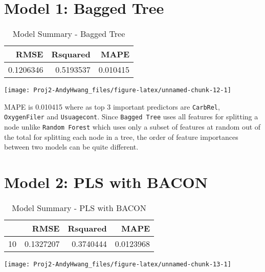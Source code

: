 \documentclass[]{report}
\begin{document}
\section{Model 1: Bagged Tree}\label{model-1-bagged-tree}

\begin{table}[H]

\caption{\label{tab:unnamed-chunk-12}Model Summary - Bagged Tree}
\centering
\fontsize{8}{10}\selectfont
\begin{tabular}[t]{rrr}
\toprule
\textbf{RMSE} & \textbf{Rsquared} & \textbf{MAPE}\\
\midrule
\rowcolor{gray!6}  0.1206346 & 0.5193537 & 0.010415\\
\bottomrule
\end{tabular}
\end{table}

\begin{center}\texttt{[image: Proj2-AndyHwang\_files/figure-latex/unnamed-chunk-12-1]} \end{center}

MAPE is 0.010415 where as top 3 important predictors are
\texttt{CarbRel}, \texttt{OxygenFiler} and \texttt{Usuagecont}. Since
\texttt{Bagged\ Tree} uses all features for splitting a node unlike
\texttt{Random\ Forest} which uses only a subset of features at random
out of the total for splitting each node in a tree, the order of feature
importances between two models can be quite different.

\section{Model 2: PLS with BACON}\label{model-2-pls-with-bacon}

\begin{table}[H]

\caption{\label{tab:unnamed-chunk-13}Model Summary - PLS with BACON}
\centering
\fontsize{8}{10}\selectfont
\begin{tabular}[t]{lrrr}
\toprule
\textbf{ } & \textbf{RMSE} & \textbf{Rsquared} & \textbf{MAPE}\\
\midrule
\rowcolor{gray!6}  10 & 0.1327207 & 0.3740444 & 0.0123968\\
\bottomrule
\end{tabular}
\end{table}

\begin{center}\texttt{[image: Proj2-AndyHwang\_files/figure-latex/unnamed-chunk-13-1]} \end{center}
\end{document}
